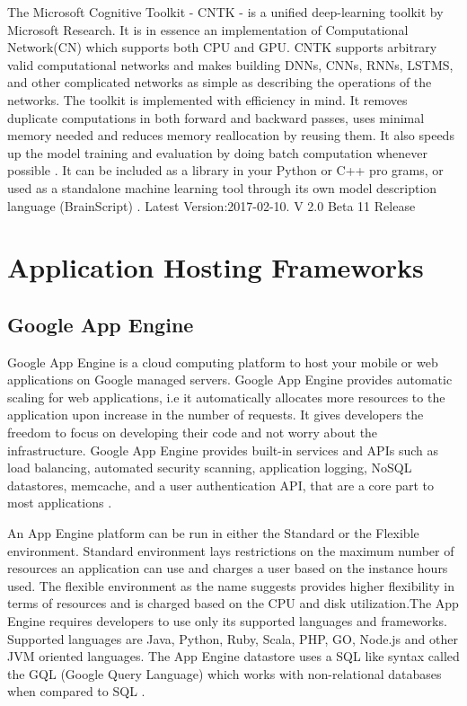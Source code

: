    The Microsoft Cognitive Toolkit - CNTK - is a unified
    deep-learning toolkit by Microsoft Research. It is in essence an
    implementation of Computational Network(CN) which supports both
    CPU and GPU. CNTK supports arbitrary valid computational networks
    and makes building DNNs, CNNs, RNNs, LSTMS, and other complicated
    networks as simple as describing the operations of the networks.
    The toolkit is implemented with efficiency in mind. It removes
    duplicate computations in both forward and backward passes, uses
    minimal memory needed and reduces memory reallocation by reusing
    them. It also speeds up the model training and evaluation by doing
    batch computation whenever possible \cite{book-cntk}. It can be
    included as a library in your Python or C++ pro grams, or used as
    a standalone machine learning tool through its own model
    description language (BrainScript) \cite{www-cntk}. Latest
    Version:2017-02-10. V 2.0 Beta 11 Release


\section{Application Hosting Frameworks}

\subsection{Google App Engine}

    Google App Engine is a cloud computing platform to host your
    mobile or web applications on Google managed servers. Google App
    Engine provides automatic scaling for web applications, i.e it
    automatically allocates more resources to the application upon
    increase in the number of requests. It gives developers the
    freedom to focus on developing their code and not worry about the
    infrastructure. Google App Engine provides built-in services and
    APIs such as load balancing, automated security scanning,
    application logging, NoSQL datastores, memcache, and a user
    authentication API, that are a core part to most
    applications \cite{www-appengine-google}.
     
    An App Engine platform can be run in either the Standard or the
    Flexible environment. Standard environment lays restrictions on
    the maximum number of resources an application can use and charges
    a user based on the instance hours used. The flexible environment
    as the name suggests provides higher flexibility in terms of
    resources and is charged based on the CPU and disk utilization.The
    App Engine requires developers to use only its supported languages
    and frameworks. Supported languages are Java, Python, Ruby, Scala,
    PHP, GO, Node.js and other JVM oriented languages. The App Engine
    datastore uses a SQL like syntax called the GQL (Google Query
    Language) which works with non-relational databases when compared
    to SQL \cite{www-wiki-appengine}.
    
